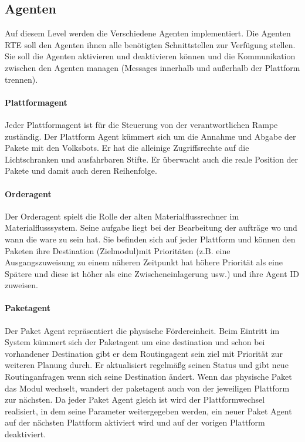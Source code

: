 \subsection{Agenten}
Auf diesem Level werden die Verschiedene Agenten implementiert. Die Agenten RTE soll den Agenten ihnen alle benötigten Schnittstellen zur
Verfügung stellen. Sie soll die Agenten aktivieren und deaktivieren können und die Kommunikation zwischen den Agenten managen
(Messages innerhalb und außerhalb der Plattform trennen)\cite[S. 26]{Stasch:Hahn}. 
\paragraph{Plattformagent}
Jeder Plattformagent ist für die Steuerung von der verantwortlichen Rampe zuständig.
Der Plattform Agent kümmert sich um die Annahme und Abgabe der Pakete mit den Volksbots. Er
hat die alleinige Zugriffsrechte auf die Lichtschranken und ausfahrbaren Stifte. Er überwacht auch die reale Position 
der Pakete und damit auch deren Reihenfolge.
\paragraph{Orderagent}
Der Orderagent spielt die Rolle der alten Materialflussrechner im Materialflusssystem. Seine aufgabe liegt bei der Bearbeitung der aufträge
wo und wann die ware zu sein hat. Sie befinden sich auf jeder Plattform und können den Paketen ihre Destination (Zielmodul)mit Prioritäten (z.B.
eine Ausgangszuweisung zu einem näheren Zeitpunkt hat höhere Priorität als eine Spätere und diese ist höher als eine Zwischeneinlagerung usw.) 
und ihre Agent ID zuweisen\cite[S. 30]{Stasch:Hahn}. 
\paragraph{Paketagent}
Der Paket Agent repräsentiert die physische Fördereinheit. Beim Eintritt im System kümmert sich der Paketagent um 
eine destination und schon bei vorhandener Destination gibt er dem Routingagent sein ziel mit Priorität zur weiteren Planung durch.
Er aktualisiert regelmäßg seinen Status und gibt neue Routinganfragen wenn sich seine Destination ändert.
Wenn das physische Paket das Modul wechselt, wandert der paketagent auch von der jeweiligen Plattform zur nächsten. 
Da jeder Paket Agent gleich ist wird der Plattformwechsel realisiert, in dem seine Parameter weitergegeben
werden, ein neuer Paket Agent auf der nächsten Plattform aktiviert wird und auf der vorigen Plattform deaktiviert\cite[S. 31]{Stasch:Hahn}.
